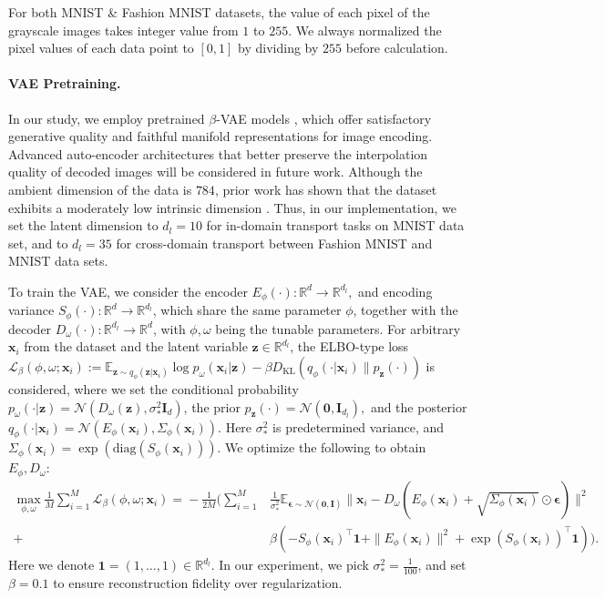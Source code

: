 \documentclass{article} %
\theoremstyle{plain}
\theoremstyle{definition}
\theoremstyle{remark}
\begin{document}
For both MNIST \& Fashion MNIST datasets, the value of each pixel of the grayscale images takes integer value from $1$ to $255$. We always normalized the pixel values of each data point to $[0, 1]$ by dividing by $255$ before calculation.

\paragraph{VAE Pretraining.} 
In our study, we employ pretrained $\beta$-VAE models \citep{kingma2013auto, higgins2017beta}, which offer satisfactory generative quality and faithful manifold representations for image encoding. Advanced auto-encoder architectures \citep{berthelot2018understanding, feng2024improving} that better preserve the interpolation quality of decoded images will be considered in future work. 
Although the ambient dimension of the data is $784$, prior work has shown that the dataset exhibits a moderately low intrinsic dimension \citep{pope2021intrinsic}. Thus, in our implementation, we set the latent dimension to $d_l = 10$ for in-domain transport tasks on MNIST data set, and to $d_l = 35$ for cross-domain transport between Fashion MNIST and MNIST data sets.

To train the VAE, we consider the encoder $E_\phi(\cdot):\mathbb{R}^{d}\rightarrow \mathbb{R}^{d_l},$ and encoding variance $S_\phi(\cdot):\mathbb{R}^{d}\rightarrow \mathbb{R}^{d_l}$, which share the same parameter $\phi$, together with the decoder $D_\omega(\cdot):\mathbb{R}^{d_l}\rightarrow \mathbb{R}^{d}$, with $\phi, \omega$ being the tunable parameters. For arbitrary $\textbf{x}_i$ from the dataset and the latent variable $\textbf{z}\in\mathbb{R}^{d_l}$, the ELBO-type loss $\mathcal L_\beta(\phi, \omega; \textbf{x}_i) := \mathbb{E}_{\textbf{z}\sim q_\phi(\textbf{z}|\textbf{x}_i)} \log p_\omega(\textbf{x}_i|\textbf{z}) - \beta D_{\mathrm{KL}}(q_\phi(\cdot|\textbf{x}_i)\|p_{\textbf{z}}(\cdot))$ is considered,
where we set the conditional probability $p_\omega(\cdot|\textbf{z})=\mathcal N(D_\omega(\textbf{z}), \sigma^2_*\textbf{I}_d)$, the prior $p_{\textbf{z}}(\cdot)=\mathcal N(\textbf{0}, \textbf{I}_{d_l}),$ and the posterior $q_\phi(\cdot|\textbf{x}_i)=\mathcal N(E_\phi(\textbf{x}_i), \Sigma_\phi(\textbf{x}_i))$. Here $\sigma_*^2$ is predetermined variance, and $\Sigma_\phi(\textbf{x}_i) = \exp(\mathrm{diag}(S_\phi(\textbf{x}_i)))$. We optimize the following to obtain $E_\phi, D_\omega$:
\begin{align*}
    \max_{\phi, \omega} \frac{1}{M}\!\sum_{i=1}^M\mathcal L_\beta(\phi, \omega; \textbf{x}_i) \! = \! -\frac{1}{2M}\!\Bigg(\!\sum_{i=1}^M & \frac{1}{\sigma_*^2}\mathbb{E}_{\boldsymbol{\epsilon}\sim \mathcal N(\textbf{0}, \textbf{I})} \|\textbf{x}_i \! - \! D_\omega(E_\phi(\textbf{x}_i)\!+\!\sqrt{\Sigma_\phi(\textbf{x}_i)}\!\odot\!\boldsymbol{\epsilon})\|^2 \\
    + & \beta(-S_\phi(\textbf{x}_i)^\top\textbf{1} + \|E_\phi(\textbf{x}_i)\|^2 + \exp(S_\phi(\textbf{x}_i))^\top\textbf{1})\Bigg).
\end{align*}
Here we denote $\textbf{1}=(1,\dots,1)\in\mathbb{R}^{d_l}$. In our experiment, we pick $\sigma_*^2=\frac{1}{100}$, and set $\beta=0.1$ to ensure reconstruction fidelity over regularization. 
\end{document}
